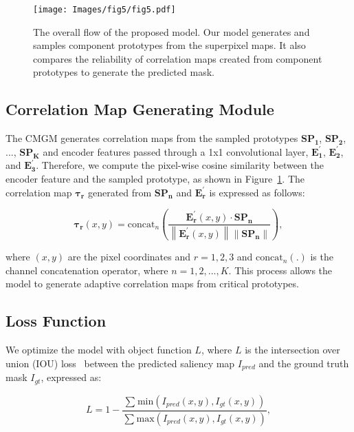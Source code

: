 \documentclass[10pt,twocolumn,letterpaper]{article}
\begin{document}
\begin{figure}[t]
	\setlength{\belowcaptionskip}{-24pt}
	\begin{center}
		\texttt{[image: Images/fig5/fig5.pdf]}
		\caption{The overall flow of the proposed model. Our model generates and samples component prototypes from the superpixel maps. It also compares the reliability of correlation maps created from component prototypes to generate the predicted mask.}
		\label{fig:CMGM}
	\end{center}
\end{figure}

\subsection{Correlation Map Generating Module}
The CMGM generates correlation maps from the sampled prototypes $\mathbf{SP_1}$, $\mathbf{SP_2}$, ..., $\mathbf{SP_K}$ and encoder features passed through a 1x1 convolutional layer, $\mathbf{E^{'}_{1}}$, $\mathbf{E^{'}_{2}}$, and $\mathbf{E^{'}_{3}}$. Therefore, we compute the pixel-wise cosine similarity between the encoder feature and the sampled prototype, as shown in Figure~\ref{fig:CMGM}. The correlation map $\mathbf{\tau _ { r }}$ generated from $\mathbf{SP_n}$ and $\mathbf{E^{'}_{r}}$ is expressed as follows:

\begin{equation}
	\mathbf{\tau _ { r }}  \left ( x,y \right ) = \textrm{concat}_{n} \left( \frac{ \mathbf{E^{'} _ { r }} \left ( x,y \right ) \cdot \mathbf{SP _ { n }} } { \left \| \mathbf{E^{'} _ { r }} \left ( x,y \right ) \right \| \left \| \mathbf{SP _ { n }} \right \| } \right),
\end{equation}

\noindent
where $\left( x,y \right)$ are the pixel coordinates and $r = 1, 2, 3$ and $\textrm{concat}_{n} \left(.\right)$ is the channel concatenation operator, where $n=1, 2, ..., K$. This process allows the model to generate adaptive correlation maps from critical prototypes.

\subsection{Loss Function}
We optimize the model with object function $L$, where $L$ is the intersection over union (IOU) loss~\cite{lin2019agss} between the predicted saliency map $I_{pred}$ and the ground truth mask $I_{gt}$, expressed as:

\begin{equation}
	L = 1- \frac{ \sum ^ { } \textrm{min} \left ( I _ { pred } \left ( x,y \right ) ,I _ { gt } \left ( x,y \right ) \right ) } { \sum ^ { } \textrm{max} \left ( I _ { pred } \left ( x,y \right ) ,I _ { gt } \left ( x,y \right ) \right ) },
\end{equation}
\end{document}
